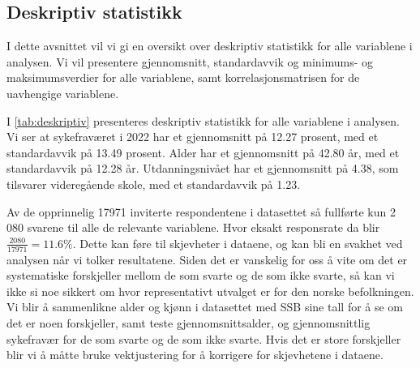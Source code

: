 \documentclass[
  12pt,
  a4paper,
  DIV=11,
  numbers=noendperiod]{scrartcl}
\begin{document}
\subsection{Deskriptiv statistikk}\label{deskriptiv-statistikk}

I dette avsnittet vil vi gi en oversikt over deskriptiv statistikk for
alle variablene i analysen. Vi vil presentere gjennomsnitt,
standardavvik og minimums- og maksimumsverdier for alle variablene, samt
korrelasjonsmatrisen for de uavhengige variablene.

I \autoref{tab:deskriptiv} presenteres deskriptiv statistikk for alle
variablene i analysen. Vi ser at sykefraværet i 2022 har et gjennomsnitt
på 12.27 prosent, med et standardavvik på 13.49 prosent. Alder har et
gjennomsnitt på 42.80 år, med et standardavvik på 12.28 år.
Utdanningsnivået har et gjennomsnitt på 4.38, som tilsvarer videregående
skole, med et standardavvik på 1.23.

Av de opprinnelig 17971 inviterte respondentene i datasettet så
fullførte kun 2 080 svarene til alle de relevante variablene. Hvor
eksakt responsrate da blir \(\frac{2080}{17971} = 11.6\%\). Dette kan
føre til skjevheter i dataene, og kan bli en svakhet ved analysen når vi
tolker resultatene. Siden det er vanskelig for oss å vite om det er
systematiske forskjeller mellom de som svarte og de som ikke svarte, så
kan vi ikke si noe sikkert om hvor representativt utvalget er for den
norske befolkningen. Vi blir å sammenlikne alder og kjønn i datasettet
med SSB sine tall for å se om det er noen forskjeller, samt teste
gjennomsnittsalder, og gjennomsnittlig sykefravær for de som svarte og
de som ikke svarte. Hvis det er store forskjeller blir vi å måtte bruke
vektjustering for å korrigere for skjevhetene i dataene.
\end{document}
